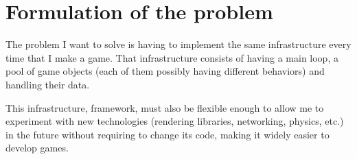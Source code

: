 \chapter{Formulation of the problem}\label{ch:formulation_of_the_problem}

The problem I want to solve is having to implement the same infrastructure every 
time that I make a game. That infrastructure consists of having a main loop, a pool 
of game objects (each of them possibly having different behaviors) and handling their 
data.

This infrastructure, framework, must also be flexible enough to allow me to experiment 
with new technologies (rendering libraries, networking, physics, etc.) in the future 
without requiring to change its code, making it widely easier to develop games.
